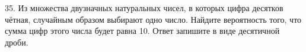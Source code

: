 35. Из множества двузначных натуральных чисел, в которых цифра десятков чётная, случайным образом выбирают одно число. Найдите вероятность того, что сумма цифр этого числа будет равна 10. Ответ запишите в виде десятичной дроби.\\

